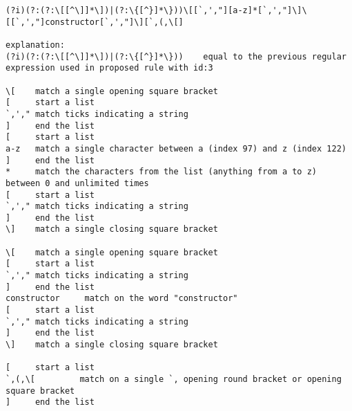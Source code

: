 \begin{lstlisting}[style=basicStyle, caption=Regular expression of proposed rule id:3, label={lst:constructorproposalregexB}]
(?i)(?:(?:\[[^\]]*\])|(?:\{[^}]*\}))\[[`,',"][a-z]*[`,',"]\]\[[`,',"]constructor[`,',"]\][`,(,\[]

explanation:
(?i)(?:(?:\[[^\]]*\])|(?:\{[^}]*\}))    equal to the previous regular expression used in proposed rule with id:3

\[    match a single opening square bracket
[     start a list
`,'," match ticks indicating a string
]     end the list
[     start a list
a-z   match a single character between a (index 97) and z (index 122)
]     end the list
*     match the characters from the list (anything from a to z) between 0 and unlimited times
[     start a list
`,'," match ticks indicating a string
]     end the list
\]    match a single closing square bracket

\[    match a single opening square bracket
[     start a list
`,'," match ticks indicating a string
]     end the list
constructor     match on the word "constructor"
[     start a list
`,'," match ticks indicating a string
]     end the list
\]    match a single closing square bracket

[     start a list
`,(,\[         match on a single `, opening round bracket or opening square bracket
]     end the list
\end{lstlisting}


